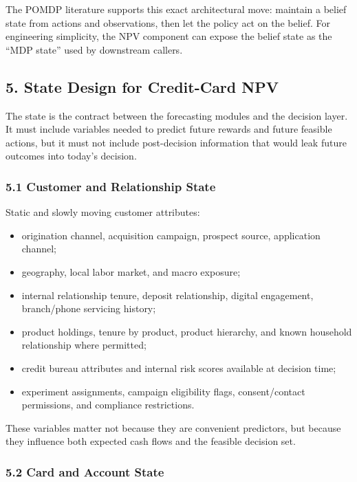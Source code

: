 \documentclass[
]{article}
\providecommand{\tightlist}{%
  \setlength{\itemsep}{0pt}\setlength{\parskip}{0pt}}
\begin{document}
The POMDP literature supports this exact architectural move: maintain a
belief state from actions and observations, then let the policy act on
the belief. For engineering simplicity, the NPV component can expose the
belief state as the ``MDP state'' used by downstream callers.

\hypertarget{state-design-for-credit-card-npv}{%
\subsection{5. State Design for Credit-Card
NPV}\label{state-design-for-credit-card-npv}}

The state is the contract between the forecasting modules and the
decision layer. It must include variables needed to predict future
rewards and future feasible actions, but it must not include
post-decision information that would leak future outcomes into today's
decision.

\hypertarget{customer-and-relationship-state}{%
\subsubsection{5.1 Customer and Relationship
State}\label{customer-and-relationship-state}}

Static and slowly moving customer attributes:

\begin{itemize}
\tightlist
\item
  origination channel, acquisition campaign, prospect source,
  application channel;
\item
  geography, local labor market, and macro exposure;
\item
  internal relationship tenure, deposit relationship, digital
  engagement, branch/phone servicing history;
\item
  product holdings, tenure by product, product hierarchy, and known
  household relationship where permitted;
\item
  credit bureau attributes and internal risk scores available at
  decision time;
\item
  experiment assignments, campaign eligibility flags, consent/contact
  permissions, and compliance restrictions.
\end{itemize}

These variables matter not because they are convenient predictors, but
because they influence both expected cash flows and the feasible
decision set.

\hypertarget{card-and-account-state}{%
\subsubsection{5.2 Card and Account
State}\label{card-and-account-state}}
\end{document}
